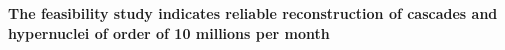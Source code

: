 \documentclass[dvipsnames] {beamer}
\begin{document}
\begin{frame}
\begin{columns}[t]
\begin{block}{}
    \end{block}
  \end{columns}
  \begin{block}{}
    \begin{center}
      \bf The feasibility study indicates reliable reconstruction of cascades and hypernuclei of order of 10 millions per month
    \end{center}
    \end{block}
  \note{}
\end{frame}

\end{document}
